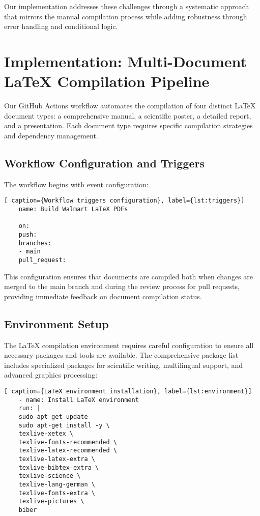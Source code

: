 Our implementation addresses these challenges through a systematic approach that mirrors the manual compilation process while adding robustness through error handling and conditional logic.

\section{Implementation: Multi-Document LaTeX Compilation Pipeline}


Our GitHub Actions workflow automates the compilation of four distinct LaTeX document types: a comprehensive manual, a scientific poster, a detailed report, and a presentation. Each document type requires specific compilation strategies and dependency management.

\subsection{Workflow Configuration and Triggers}

The workflow begins with event configuration:

\begin{lstlisting}[breaklines=true][ caption={Workflow triggers configuration}, label={lst:triggers}]
	name: Build Walmart LaTeX PDFs
	
	on:
	push:
	branches:
	- main
	pull_request:
\end{lstlisting}

This configuration ensures that documents are compiled both when changes are merged to the main branch and during the review process for pull requests, providing immediate feedback on document compilation status.

\subsection{Environment Setup}

The LaTeX compilation environment requires careful configuration to ensure all necessary packages and tools are available. The comprehensive package list includes specialized packages for scientific writing, multilingual support, and advanced graphics processing:

\begin{lstlisting}[breaklines=true][ caption={LaTeX environment installation}, label={lst:environment}]
	- name: Install LaTeX environment
	run: |
	sudo apt-get update
	sudo apt-get install -y \
	texlive-xetex \
	texlive-fonts-recommended \
	texlive-latex-recommended \
	texlive-latex-extra \
	texlive-bibtex-extra \
	texlive-science \
	texlive-lang-german \
	texlive-fonts-extra \
	texlive-pictures \
	biber
\end{lstlisting}

